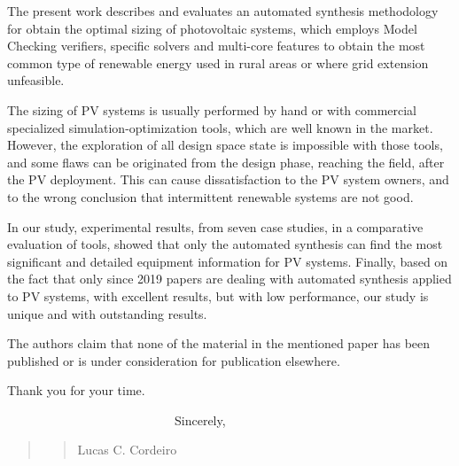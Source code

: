 \documentclass[11pt]{article}
\newcommand\vi{\vspace{\baselineskip}}
\begin{document}
The present work describes and evaluates an automated synthesis methodology for obtain the optimal sizing of photovoltaic systems, which employs Model Checking verifiers, specific solvers and multi-core  features to obtain the most common type of renewable energy used in rural areas or where grid extension unfeasible.

The sizing of PV systems is usually performed by hand or with commercial specialized simulation-optimization tools, which are well known in the market. However, the exploration of all design space state is impossible with those tools, and some flaws can be originated from the design phase, reaching the field, after the PV deployment. This can cause dissatisfaction to the PV system owners, and to the wrong conclusion that intermittent renewable systems are not good.
   
In our study, experimental results, from seven case studies, in a comparative evaluation of tools, showed that only the automated synthesis can find the most significant and detailed equipment information for PV systems. Finally, based on the fact that only since 2019 papers are dealing with automated synthesis applied to PV systems, with excellent results, but with low performance, our study is unique and with outstanding results.

The  authors  claim  that  none  of  the  material  in  the mentioned  paper  has  been  published  or  is  under  consideration for publication elsewhere.

\vi
Thank you for your time.
\vi

\indent
~~~~~~~~~~~~~~~~~~~~~~~~~~~Sincerely,\\

\begin{quote}
\begin{quote}
\begin{flushright}



Lucas C. Cordeiro~~~~~~~
\end{flushright}
\end{quote}
\end{quote}


 
 
\end{document}
